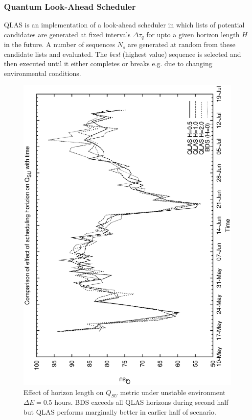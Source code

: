 \documentclass[12pt,a4paper]{article}
\begin{document}
{\subsubsection{Quantum Look-Ahead Scheduler} QLAS is an implementation of a look-ahead scheduler in which lists of potential candidates are generated at fixed intervals $\Delta \tau _q$ for upto a given horizon length $H$ in the future. A number of sequences $N_s$ are generated at random from these candidate lists and evaluated. The \emph{best} (highest value) sequence is selected and then executed until it either completes or breaks e.g. due to changing environmental conditions.
\begin{figure}[htp]
\begin{center} 
  \includegraphics[scale=0.5, angle=-90]{figures/qsa3_su.eps}
  \caption[Effect of horizon length on $Q_{SU}$ metric under unstable environment $\Delta E = 0.5h$]
{\label{fig:suplot} Effect of horizon length on $Q_{SU}$  metric under unstable environment $\Delta E = 0.5$ hours. BDS exceeds all QLAS horizons during second half but QLAS performs marginally better in earlier half of scenario.}
\end{center}
\end{figure}

}
\end{document}
